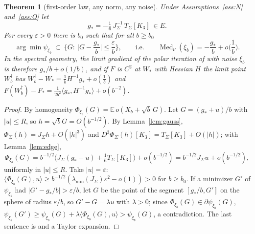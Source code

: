 \documentclass[10pt]{article}
\newtheorem{theorem}{Theorem}
\theoremstyle{definition}
\theoremstyle{remark}
\newcommand{\E}{\mathbb{E}}
\newcommand{\inner}[2]{\langle #1, #2\rangle}
\newcommand{\Med}{\operatorname{Med}}
\newcommand{\st}{\dagger}
\begin{document}
\begin{theorem}[first-order law, any norm, any noise]\label{thm:cf}
Under Assumptions~\ref{ass:N} and~\ref{ass:O} let
\begin{equation}\label{eq:gstar}
g_\ast=-\tfrac16\,J_\Sigma^{-1}\,T_\Sigma[K_3]\ \in E .
\end{equation}
For every $\varepsilon>0$ there is $b_0$ such that for all $b\ge b_0$
\[
\arg\min\psi_{\xi_b}\ \subset\ \Big\{G:\ \Big|G-\frac{g_\ast}b\Big|\le\frac\varepsilon b\Big\},\qquad\text{i.e.}\qquad
\Med_\nu(\xi_b)=-\frac{g_\ast}b+o\Big(\frac1b\Big).
\]
In the spectral geometry, the limit gradient of the polar iteration of \cite[Theorem~2]{manuscript} with noise
$\xi_b$ is therefore $g_\ast/b+o(1/b)$, and if $F$ is $C^2$ at $W_\ast$ with Hessian $H$ the limit point $W^\st_b$ has
$W^\st_b-W_\ast=\frac1bH^{-1}g_\ast+o(\frac1b)$ and $F(W^\st_b)-F_\ast=\frac1{2b^2}\inner{g_\ast}{H^{-1}g_\ast}+o(b^{-2})$.
\end{theorem}
\begin{proof}
By homogeneity $\Phi_{\xi_b}(G)=\E\,o(X_b+\sqrt b\,G)$. Let $G=(g_\ast+u)/b$ with $|u|\le R$, so $h=\sqrt bG=O(b^{-1/2})$.
By Lemma~\ref{lem:gauss}, $\Phi_\Sigma(h)=J_\Sigma h+O(|h|^3)$ and $D^3\Phi_\Sigma(h)[K_3]=T_\Sigma[K_3]+O(|h|)$; with
Lemma~\ref{lem:edge},
\[
\Phi_{\xi_b}(G)=b^{-1/2}\big(J_\Sigma(g_\ast+u)+\tfrac16T_\Sigma[K_3]\big)+o(b^{-1/2})=b^{-1/2}J_\Sigma u+o(b^{-1/2}),
\]
uniformly in $|u|\le R$. Take $|u|=\varepsilon$: $\inner{\Phi_{\xi_b}(G)}{u}\ge b^{-1/2}(\lambda_{\min}(J_\Sigma)\varepsilon^2-o(1))>0$
for $b\ge b_0$. If a minimizer $G'$ of $\psi_{\xi_b}$ had $|G'-g_\ast/b|>\varepsilon/b$, let $G$ be the point of the
segment $[g_\ast/b,G']$ on the sphere of radius $\varepsilon/b$, so $G'-G=\lambda u$ with $\lambda>0$; since
$\Phi_{\xi_b}(G)\in\partial\psi_{\xi_b}(G)$, $\psi_{\xi_b}(G')\ge\psi_{\xi_b}(G)+\lambda\inner{\Phi_{\xi_b}(G)}u>\psi_{\xi_b}(G)$,
a contradiction. The last sentence is \cite[Theorem~2]{manuscript} and a Taylor expansion.
\end{proof}
\end{document}
